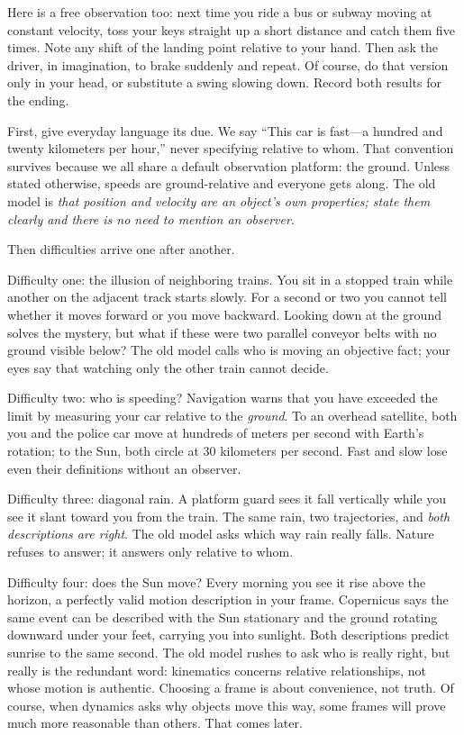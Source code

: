 Here is a free observation too: next time you ride a bus or subway moving at constant velocity, toss your keys straight up a short distance and catch them five times. Note any shift of the landing point relative to your hand. Then ask the driver, in imagination, to brake suddenly and repeat. Of course, do that version only in your head, or substitute a swing slowing down. Record both results for the ending.


First, give everyday language its due. We say ``This car is fast---a hundred and twenty kilometers per hour,'' never specifying relative to whom. That convention survives because we all share a default observation platform: the ground. Unless stated otherwise, speeds are ground-relative and everyone gets along. The old model is \emph{that position and velocity are an object's own properties; state them clearly and there is no need to mention an observer}.

Then difficulties arrive one after another.

Difficulty one: the illusion of neighboring trains. You sit in a stopped train while another on the adjacent track starts slowly. For a second or two you cannot tell whether it moves forward or you move backward. Looking down at the ground solves the mystery, but what if these were two parallel conveyor belts with no ground visible below? The old model calls who is moving an objective fact; your eyes say that watching only the other train cannot decide.

Difficulty two: who is speeding? Navigation warns that you have exceeded the limit by measuring your car relative to the \emph{ground}. To an overhead satellite, both you and the police car move at hundreds of meters per second with Earth's rotation; to the Sun, both circle at 30 kilometers per second. Fast and slow lose even their definitions without an observer.

Difficulty three: diagonal rain. A platform guard sees it fall vertically while you see it slant toward you from the train. The same rain, two trajectories, and \emph{both descriptions are right}. The old model asks which way rain really falls. Nature refuses to answer; it answers only relative to whom.

Difficulty four: does the Sun move? Every morning you see it rise above the horizon, a perfectly valid motion description in your frame. Copernicus says the same event can be described with the Sun stationary and the ground rotating downward under your feet, carrying you into sunlight. Both descriptions predict sunrise to the same second. The old model rushes to ask who is really right, but really is the redundant word: kinematics concerns relative relationships, not whose motion is authentic. Choosing a frame is about convenience, not truth. Of course, when dynamics asks why objects move this way, some frames will prove much more reasonable than others. That comes later.


